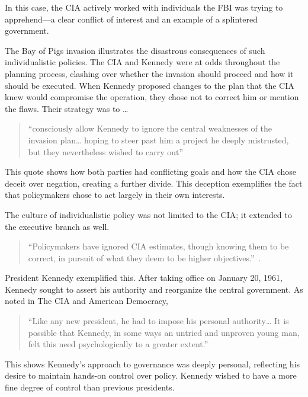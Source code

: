 \documentclass[12pt]{article}
\begin{document}
    In this case, the CIA actively worked with individuals the FBI was trying to apprehend—a clear conflict of interest and an example of a splintered government.

    The Bay of Pigs invasion illustrates the disastrous consequences of such individualistic policies. The CIA and Kennedy were at odds throughout the planning process, clashing over whether the invasion should proceed and how it should be executed. When Kennedy proposed changes to the plan that the CIA knew would compromise the operation, they chose not to correct him or mention the flaws. Their strategy was to \ldots
    
    \begin{quotation}
        ``consciously allow Kennedy to ignore the central weaknesses of the invasion plan… hoping to steer past him a project he deeply mistrusted, but they nevertheless wished to carry out'' \parencite{Vandenbroucke1984} 
    \end{quotation}
    
    This quote shows how both parties had conflicting goals and how the CIA chose deceit over negation, creating a further divide. This deception exemplifies the fact that policymakers chose to act largely in their own interests.

    The culture of individualistic policy was not limited to the CIA; it extended to the executive branch as well. 

    \begin{quote}
        ``Policymakers have ignored CIA estimates, though knowing them to be correct, in pursuit of what they deem to be higher objectives.''~\parencite{JeffreysJones2003}.
    \end{quote}
    
    President Kennedy exemplified this. After taking office on January 20, 1961, Kennedy sought to assert his authority and reorganize the central government. As noted in The CIA and American Democracy, 

    \begin{quotation}
        ``Like any new president, he had to impose his personal authority… It is possible that Kennedy, in some ways an untried and unproven young man, felt this need psychologically to a greater extent.''~\parencite{JeffreysJones2003}
    \end{quotation}  

    This shows Kennedy's approach to governance was deeply personal, reflecting his desire to maintain hands-on control over policy. Kennedy wished to have a more fine degree of control than previous presidents.
\end{document}
